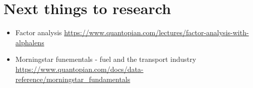 \documentclass[10pt,a4paper]{article}
\begin{document}
\section{Next things to research}
\begin{itemize}
\item Factor analysis \url{ https://www.quantopian.com/lectures/factor-analysis-with-alphalens}
\item Morningstar funementals  - fuel and the transport industry \\ \url{ https://www.quantopian.com/docs/data-reference/morningstar_fundamentals}
\end{itemize}
\end{document}
